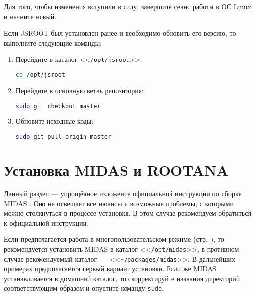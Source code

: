 \documentclass[12pt, a4paper, oneside, onecolumn]{book}
\newcommand{\MIDAS}{\mbox{MIDAS}}
\newcommand{\ROOTJS}{\mbox{JSROOT}}
\newcommand{\ROOTANA}{\mbox{ROOTANA}}
\newcommand{\APP}[1]{\mbox{\tt #1}}
\newcommand{\DIRECTORY}[1]{<<{\tt #1}>>}
\begin{document}
Для того, чтобы изменения вступили в силу, завершите сеанс работы в ОС Linux и начните новый.

Если \ROOTJS{} был установлен ранее и необходимо обновить его версию, то выполните следующие команды:

\begin{enumerate}
\item Перейдите в каталог \DIRECTORY{/opt/jsroot}:

\begin{lstlisting}[language=bash]
cd /opt/jsroot
\end{lstlisting}

\item Перейдите в основную ветвь репозитория:

\begin{lstlisting}[language=bash]
sudo git checkout master
\end{lstlisting}

\item Обновите исходные коды:

\begin{lstlisting}[language=bash]
sudo git pull origin master
\end{lstlisting}

\end{enumerate}

\section{Установка \MIDAS{} и \ROOTANA{}}

Данный раздел --- упрощённое изложение официальной инструкции по сборке \MIDAS{} \cite{MidasWikiInstall}. Оно не освещает все нюансы и возможные проблемы, с которыми можно столкнуться в процессе установки. В этом случае рекомендуем обратиться к официальной инструкции.

Если предполагается работа в многопользовательском режиме (стр.~\pageref{sec_multiuser}), то рекомендуется установить \MIDAS{} в каталог \DIRECTORY{/opt/midas}, в противном случае рекомендуемый каталог~--- \DIRECTORY{\~{}/packages/midas}. В дальнейших примерах предполагается первый вариант установки. Если же \MIDAS{} устанавливается в домашний каталог, то скорректируйте названия директорий соответствующим образом и  опустите команду \APP{sudo}.
\end{document}
